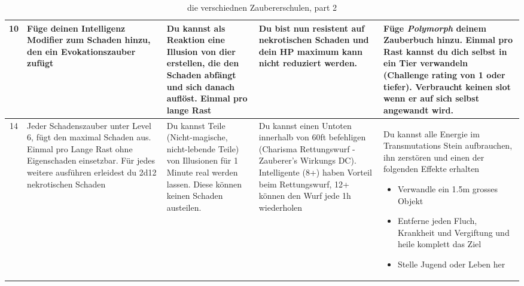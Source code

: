 \begin{table}
\begin{tabular}{cp{6cm}p{6cm}p{6cm}p{6cm}}
	10 & Füge deinen Intelligenz Modifier zum Schaden hinzu, den ein Evokationszauber zufügt
	& Du kannst als Reaktion eine Illusion von dier erstellen, die den Schaden abfängt und sich danach auflöst. Einmal pro lange Rast
	& Du bist nun resistent auf nekrotischen Schaden und dein HP maximum kann nicht reduziert werden.
	& Füge \textit{Polymorph} deinem Zauberbuch hinzu. Einmal pro Rast kannst du dich selbst in ein Tier verwandeln (Challenge rating von 1 oder tiefer). Verbraucht keinen slot wenn er auf sich selbst angewandt wird.
	\\ \hline
	
	14 & Jeder Schadenszauber unter Level 6, fügt den maximal Schaden aus. Einmal pro Lange Rast ohne Eigenschaden einsetzbar. Für jedes weitere ausführen erleidest du 2d12 nekrotischen Schaden
	& Du kannst Teile (Nicht-magische, nicht-lebende Teile) von Illusionen für 1 Minute real werden lassen. Diese können keinen Schaden austeilen.
	& Du kannst einen Untoten innerhalb von 60ft befehligen (Charisma Rettungswurf - Zauberer's Wirkungs DC). Intelligente (8+) haben Vorteil beim Rettungswurf, 12+ können den Wurf jede 1h wiederholen
	& Du kannst alle Energie im Transmutations Stein aufbrauchen, ihn zerstören und einen der folgenden Effekte erhalten
	\begin{itemize}
		\item Verwandle ein 1.5m grosses Objekt
		\item Entferne jeden Fluch, Krankheit und Vergiftung und heile komplett das Ziel
		\item Stelle Jugend oder Leben her
	\end{itemize}
	\\
	\end{tabular}
	\caption{die verschiednen Zaubererschulen, part 2}
\end{table}
